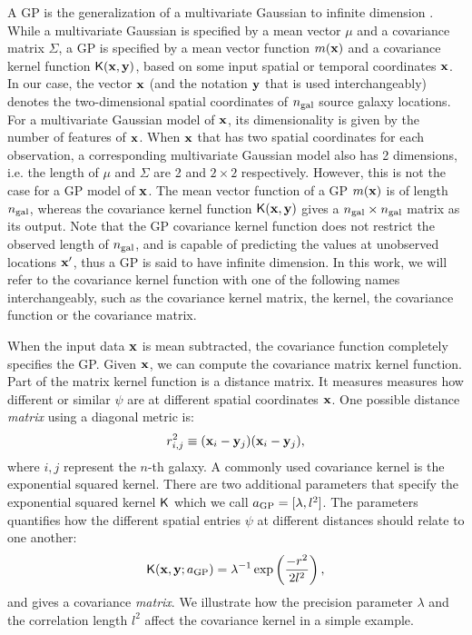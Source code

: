 A GP is the generalization of a multivariate Gaussian 
to infinite dimension \citep{Rasmussen2006}. While a multivariate Gaussian is
specified by a mean vector $\mu$ and a covariance matrix $\Sigma$, 
a GP is specified by a mean vector function $m(\mathbf{x})$ and a
covariance kernel function $\mathsf{K}(\mathbf{x}, \mathbf{y})$, based on some input spatial or
temporal coordinates $\mathbf{x}$. In our case, the vector $\mathbf{x}$ (and the
notation $\mathbf{y}$ that is used interchangeably) denotes the
two-dimensional spatial coordinates of $n_{\rm gal}$ source galaxy locations. 
For a multivariate Gaussian model of $\mathbf{x}$, 
its dimensionality is given by the number of features of $\mathbf{x}$.
When $\mathbf{x}$ that has two spatial coordinates for each observation, 
a corresponding multivariate Gaussian model also has 2 dimensions, 
i.e. the length of $\mu$ and $\Sigma$ are 2 and $2 \times 2$ respectively. 
However, this is not the case for a GP model of $\mathbf{x}$. 
The mean vector function of a GP $m(\mathbf{x})$ is of length $n_{\rm gal}$, 
whereas the covariance kernel function $\mathsf{K}(\mathbf{x}, \mathbf{y})$
gives a $n_{\rm gal} \times n_{\rm gal}$ matrix as its output.
Note that the GP covariance kernel function does not restrict the 
observed length of $n_{\rm gal}$, and is capable of predicting the values at
unobserved locations $\mathbf{x}'$, thus a GP is said to have infinite dimension. 
In this work, we will refer to the covariance kernel function with one of 
the following names interchangeably, such as the 
covariance kernel matrix, the kernel, the covariance
function or the covariance matrix. 

When the input data $\mathbf{x}$ is mean subtracted, the covariance function  
completely specifies the GP.
Given  $\mathbf{x}$, we can compute the covariance matrix kernel function. 
Part of the matrix kernel function is a distance matrix. It measures  
measures how different or similar $\psi$ are at different spatial coordinates $\mathbf{x}$. 
One possible distance {\it matrix} using a diagonal metric is: 
\begin{equation}
	r_{i, j}^2 \equiv (\mathbf{x}_i - \mathbf{y}_j) (\mathbf{x}_i - \mathbf{y}_j), 
	\label{eq:distance}
\end{equation}
where $i, j$ represent the $n$-th galaxy.
A commonly used covariance kernel is the exponential squared kernel. There are two
additional parameters that specify the exponential squared kernel $\mathsf{K}$ 
which we call $a_{\rm GP} = [\lambda, l^2]$. The parameters quantifies how the
different spatial entries $\psi$ at different distances should relate to one another: 
\begin{equation}
	\mathsf{K}(\mathbf{x}, \mathbf{y};a_{\rm GP}) = \lambda^{-1} \exp\left(\frac{-r^2}{2 l^2}\right),
	\label{eqn:exp_sq_kernel}
\end{equation}
and gives a covariance {\it matrix}.
We illustrate how the precision parameter $\lambda$ and the correlation
length $l^2$ affect the covariance kernel in a simple example. 

